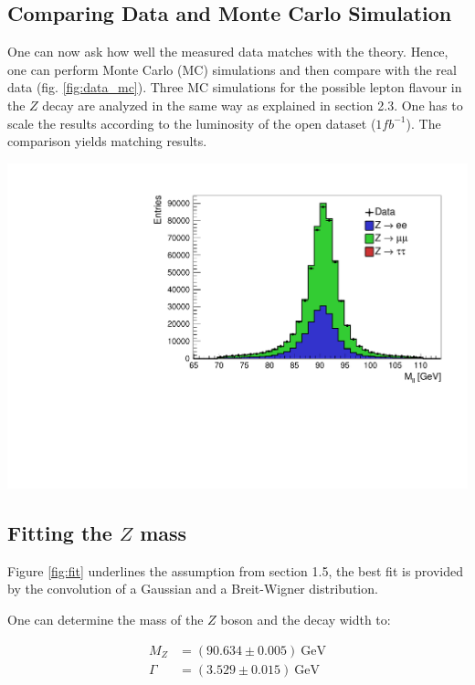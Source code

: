 \documentclass[12pt, a4paper, bibliography=totoc]{scrartcl}
\begin{document}
\begin{multicols}{2}
\subsection{Comparing Data and Monte Carlo Simulation}
One can now ask how well the measured data matches with the theory. 
Hence, one can perform Monte Carlo (MC) simulations and then compare with the real data (fig. \ref{fig:data_mc}). 
Three MC simulations for the possible lepton flavour in the $Z$ decay are analyzed in the same way as explained in section 2.3. 
One has to scale the results according to the luminosity of the open dataset ($1 fb^{-1}$).
The comparison yields matching results.
\begin{center}
	\includegraphics[width=\linewidth]{fig/vergleich_data_mc_final.pdf}
	\label{fig:data_mc}
\end{center}


\subsection{Fitting the $Z$ mass}
Figure \ref{fig:fit} underlines the assumption from section 1.5, the best fit is provided by the convolution of a Gaussian and a Breit-Wigner distribution. 

One can determine the mass of the $Z$ boson and the decay width to: 

\begin{align}
M_Z &= (90.634 \pm 0.005) \ \text{GeV}\\
\Gamma &= (3.529 \pm 0.015) \ \text{GeV}
\end{align}


\end{multicols}
\end{document}
